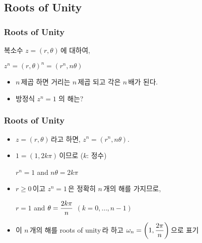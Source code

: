 \subsection*{Roots of Unity}
\begin{frame}
    \frametitle{Roots of Unity}
    \begin{theorem}[드 무아브르의 정리]
        복소수 \(z = (r, \theta)\)\,에 대하여,
        \begin{center}
            \(z^n = (r, \theta)^n = (r^n, n\theta)\)
        \end{center}
    \end{theorem}

    \pause

    \begin{itemize}
        \item \(n\)\,제곱 하면 거리는 \(n\)\,제곱 되고 각은 \(n\)\,배가 된다. \pause
        \item \alert{방정식 \(z^n = 1\) 의 해는?}
    \end{itemize}
\end{frame}

\begin{frame}
    \frametitle{Roots of Unity}
    \begin{itemize}
        \setlength{\itemsep}{1em}
        \item \(z = (r, \theta)\)\,라고 하면, \(z^n = (r^n, n\theta)\). \pause
        \item \(1 = (1, 2k\pi)\)\,이므로 (\(k\): 정수)
              \vspace*{10px}
              \begin{center}
                  \(r^n = 1\) and \(n\theta = 2k\pi\)
              \end{center} \pause
        \item \(r \geq 0\)\,이고 \(z^n = 1\)\,은 정확히 \(n\)\,개의 해를 가지므로,
              \vspace*{10px}
              \begin{center}
                  \alert{\(r = 1\)} and \alert{\(\displaystyle \theta = \frac{2k\pi}{n}\)} \quad \((k = 0, \dots, n - 1)\)
              \end{center} \pause
        \item 이 \(n\)\,개의 해를 \alert{roots of unity}\,라 하고 \(\displaystyle \omega_n = \left(1, \frac{2\pi}{n}\right)\)\,으로 표기
    \end{itemize}
\end{frame}

